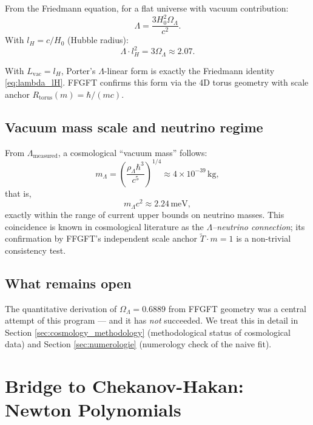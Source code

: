 From the Friedmann equation, for a flat universe with vacuum contribution:
\begin{equation}
\Lambda = \frac{3 H_0^2 \Omega_\Lambda}{c^2}.
\end{equation}
With \(l_H = c/H_0\) (Hubble radius):
\begin{equation}
\Lambda \cdot l_H^2 = 3 \Omega_\Lambda \approx 2.07.
\label{eq:lambda_lH}
\end{equation}

\begin{keyresult}
With \(L_\text{vac} = l_H\), Porter's \(\Lambda\)-linear form is exactly the Friedmann identity \eqref{eq:lambda_lH}. FFGFT confirms this form via the 4D torus geometry with scale anchor \(R_\text{torus}(m) = \hbar/(mc)\).
\end{keyresult}

\subsection{Vacuum mass scale and neutrino regime}

From \(\Lambda_\text{measured}\), a cosmological ``vacuum mass'' follows:
\begin{equation}
m_\Lambda = \left(\frac{\rho_\Lambda \hbar^3}{c^5}\right)^{1/4} \approx 4 \times 10^{-39}\,\text{kg},
\end{equation}
that is,
\begin{equation}
m_\Lambda c^2 \approx 2.24\,\text{meV},
\end{equation}
exactly within the range of current upper bounds on neutrino masses. This coincidence is known in cosmological literature as the \emph{$\Lambda$--neutrino connection}; its confirmation by FFGFT's independent scale anchor \(\tilde T \cdot m = 1\) is a non-trivial consistency test.

\subsection{What remains open}

The quantitative derivation of \(\Omega_\Lambda = 0.6889\) from FFGFT geometry was a central attempt of this program --- and it has \emph{not} succeeded. We treat this in detail in Section \ref{sec:cosmology_methodology} (methodological status of cosmological data) and Section \ref{sec:numerologie} (numerology check of the naive fit).

\section{Bridge to Chekanov-Hakan: Newton Polynomials}
\label{sec:chekanov}

